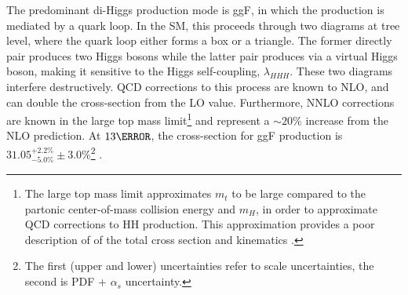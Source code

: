 The predominant di-Higgs production mode is \gls{ggF}, in which the production is mediated by a quark loop. In the \gls{SM}, this proceeds through two diagrams at tree level, where the quark loop either forms a box or a triangle. The former directly pair produces two Higgs bosons while the latter pair produces via a virtual Higgs boson, making it sensitive to the Higgs self-coupling, $\lambda_{HHH}$. These two diagrams interfere destructively. QCD corrections to this process are known to \gls{NLO}, and can double the cross-section from the \gls{LO} value. Furthermore, \gls{NNLO} corrections are known in the large top mass limit\footnote{The large top mass limit approximates $m_t$ to be large compared to the partonic center-of-mass collision energy and $m_H$, in order to approximate \gls{QCD} corrections to HH production. This approximation provides a poor description of of the total cross section and kinematics \cite{large-mt}.} and represent a $\sim 20\%$ increase from the \gls{NLO} prediction. At $\unit{13}{\TeV}$, the cross-section for \gls{ggF} production is $31.05^{+2.2\%}_{-5.0\%} \pm 3.0\%$\footnote{The first (upper and lower) uncertainties refer to scale uncertainties, the second is PDF + $\alpha_s$ uncertainty.}  \cite{hh-crosssections}.

